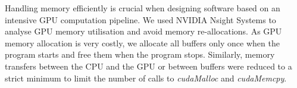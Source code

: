 Handling memory efficiently is crucial when designing software based on an intensive GPU computation pipeline. We used NVIDIA Nsight Systems to analyse GPU memory utilisation and avoid memory re-allocations. As GPU memory allocation is very costly, we allocate all buffers only once when the program starts and free them when the program stops. Similarly, memory transfers between the CPU and the GPU or between buffers were reduced to a strict minimum to limit the number of calls to \textit{cudaMalloc} and \textit{cudaMemcpy}.